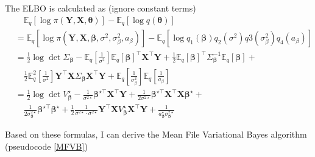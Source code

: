 \documentclass[12pt]{article}
\begin{document}
The ELBO is calculated as (ignore constant terms)
\begin{align*}
	&\quad \mathbb{E}_q[\log \pi (\bm{Y}, \bm{X}, \bm{\theta})] - \mathbb{E}_q[\log q(\bm{\theta})]\\
	&=\mathbb{E}_q[\log \pi (\bm{Y}, \bm{X}, \bm{\beta}, \sigma^2, \sigma_{\beta}^2, a_{\beta})] - \mathbb{E}_q[\log q_1(\bm{\beta})q_2(\sigma^2)q3(\sigma_{\beta}^2)q_4(a_{\beta})]\\
	&=\frac{1}{2} \log \det \Sigma_{\bm{\beta}} -\mathbb{E}_q\left[\frac{1}{\sigma^2} \right]\mathbb{E}_q[\bm{\beta}]^\top \bm{X}^\top \bm{Y} + \frac{1}{2}\mathbb{E}_q[\bm{\beta}]^\top \Sigma_{\bm{\beta}}^{-1} \mathbb{E}_q[\bm{\beta}]+\\
	&\quad \frac{1}{2} \mathbb{E}_q^{2}\left[\frac{1}{\sigma^2} \right] \bm{Y}^\top \bm{X} \Sigma_{\bm{\beta}} \bm{X}^\top \bm{Y} + \mathbb{E}_q\left[\frac{1}{\sigma_\beta^2}\right] \mathbb{E}_q\left[\frac{1}{a_\beta}\right] \\
	& = \frac{1}{2}\log \det V_{\bm{\beta}}^{\star} - \frac{1}{\sigma^{2\star}}\bm{\beta}^{\star \top} \bm{X}^\top \bm{Y} + \frac{1}{2\sigma^{2\star}} \bm{\beta}^{\star \top} \bm{X}^\top \bm{X} \bm{\beta}^{\star} +\\
	&\quad \frac{1}{2\sigma_{\bm{\beta}}^{2\star}}\bm{\beta}^{\star \top} \bm{\beta}^{\star} + \frac{1}{2}\frac{1}{\sigma^{2\star}\cdot \sigma^{2\star}}\bm{Y}^{\top} \bm{X} V_{\bm{\beta}}^{\star} \bm{X}^{\top} \bm{Y} + \frac{1}{a_{\bm{\beta}}^{\star} \sigma_{\bm{\beta}}^{2 \star}}	
\end{align*}


Based on these formulas, I can derive the Mean File Variational Bayes algorithm (pseudocode \ref{MFVB})
\end{document}
